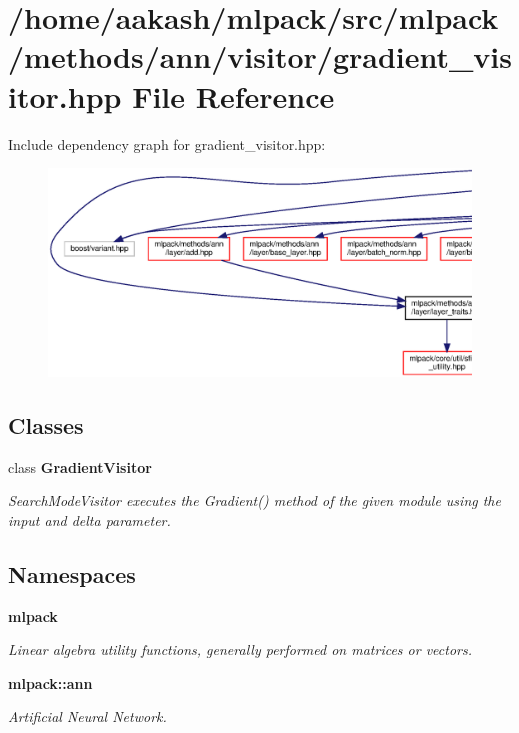 \section{/home/aakash/mlpack/src/mlpack/methods/ann/visitor/gradient\+\_\+visitor.hpp File Reference}
\label{gradient__visitor_8hpp}
Include dependency graph for gradient\+\_\+visitor.\+hpp\+:
\nopagebreak
\begin{figure}[H]
\begin{center}
\leavevmode
\includegraphics[width=350pt]{gradient__visitor_8hpp__incl}
\end{center}
\end{figure}
\subsection*{Classes}
\begin{DoxyCompactItemize}
\item 
class \textbf{ Gradient\+Visitor}
\begin{DoxyCompactList}\small\item\em Search\+Mode\+Visitor executes the Gradient() method of the given module using the input and delta parameter. \end{DoxyCompactList}\end{DoxyCompactItemize}
\subsection*{Namespaces}
\begin{DoxyCompactItemize}
\item 
 \textbf{ mlpack}
\begin{DoxyCompactList}\small\item\em Linear algebra utility functions, generally performed on matrices or vectors. \end{DoxyCompactList}\item 
 \textbf{ mlpack\+::ann}
\begin{DoxyCompactList}\small\item\em Artificial Neural Network. \end{DoxyCompactList}\end{DoxyCompactItemize}


